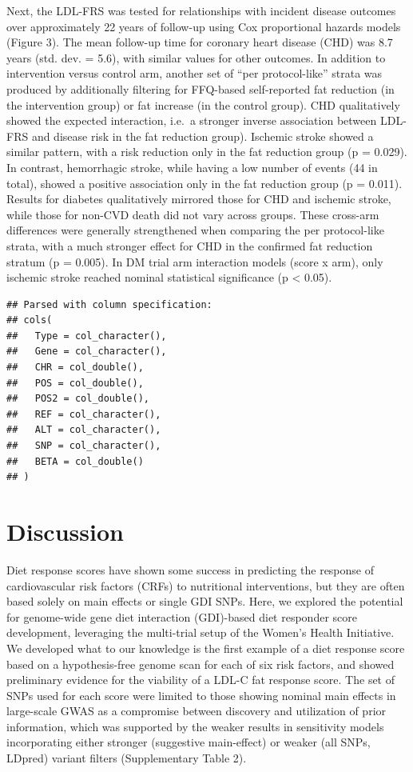 \documentclass[]{article}
\begin{document}
Next, the LDL-FRS was tested for relationships with incident disease
outcomes over approximately 22 years of follow-up using Cox proportional
hazards models (Figure 3). The mean follow-up time for coronary heart
disease (CHD) was 8.7 years (std. dev. = 5.6), with similar values for
other outcomes. In addition to intervention versus control arm, another
set of ``per protocol-like'' strata was produced by additionally
filtering for FFQ-based self-reported fat reduction (in the intervention
group) or fat increase (in the control group). CHD qualitatively showed
the expected interaction, i.e.~a stronger inverse association between
LDL-FRS and disease risk in the fat reduction group). Ischemic stroke
showed a similar pattern, with a risk reduction only in the fat
reduction group (p = 0.029). In contrast, hemorrhagic stroke, while
having a low number of events (44 in total), showed a positive
association only in the fat reduction group (p = 0.011). Results for
diabetes qualitatively mirrored those for CHD and ischemic stroke, while
those for non-CVD death did not vary across groups. These cross-arm
differences were generally strengthened when comparing the per
protocol-like strata, with a much stronger effect for CHD in the
confirmed fat reduction stratum (p = 0.005). In DM trial arm interaction
models (score x arm), only ischemic stroke reached nominal statistical
significance (p \textless{} 0.05).

\begin{verbatim}
## Parsed with column specification:
## cols(
##   Type = col_character(),
##   Gene = col_character(),
##   CHR = col_double(),
##   POS = col_double(),
##   POS2 = col_double(),
##   REF = col_character(),
##   ALT = col_character(),
##   SNP = col_character(),
##   BETA = col_double()
## )
\end{verbatim}

\hypertarget{discussion}{%
\section{Discussion}\label{discussion}}

Diet response scores have shown some success in predicting the response
of cardiovascular risk factors (CRFs) to nutritional interventions, but
they are often based solely on main effects or single GDI SNPs. Here, we
explored the potential for genome-wide gene diet interaction (GDI)-based
diet responder score development, leveraging the multi-trial setup of
the Women's Health Initiative. We developed what to our knowledge is the
first example of a diet response score based on a hypothesis-free genome
scan for each of six risk factors, and showed preliminary evidence for
the viability of a LDL-C fat response score. The set of SNPs used for
each score were limited to those showing nominal main effects in
large-scale GWAS as a compromise between discovery and utilization of
prior information, which was supported by the weaker results in
sensitivity models incorporating either stronger (suggestive
main-effect) or weaker (all SNPs, LDpred) variant filters (Supplementary
Table 2).
\end{document}
